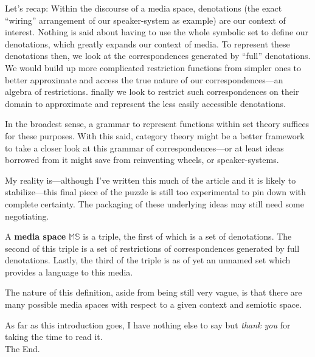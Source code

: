 \documentclass[twoside]{article}
\newenvironment{definition}[1][Definition]{\begin{trivlist}
\item[\hskip \labelsep {\bfseries #1:}]}{\end{trivlist}}
\begin{document}
Let's recap: Within the discourse of a media space, denotations (the exact ``wiring'' arrangement of our speaker-system
as example) are our context of interest. Nothing is said about having to use the whole symbolic set to define our denotations,
which greatly expands our context of media. To represent these denotations then, we look at the correspondences generated
by ``full'' denotations. We would build up more complicated restriction functions from simpler ones to better approximate
and access the true nature of our correspondences---an algebra of restrictions. finally we look to restrict such
correspondences on their domain to approximate and represent the less easily accessible denotations.

In the broadest sense, a grammar to represent functions within set theory suffices for these purposes.  With this said,
category theory might be a better framework to take a closer look at this grammar of correspondences---or at least ideas
borrowed from it might save from reinventing wheels, or speaker-systems.

My reality is---although I've written this much of the article and it is likely to stabilize---this final piece of the puzzle
is still too experimental to pin down with complete certainty. The packaging of these underlying ideas may still need some
negotiating.

\begin{definition}[Media Space]

A {\bfseries media space} $ \mathbb{MS} $ is a triple, the first of which is a set of denotations. The second of this triple
is a set of restrictions of correspondences generated by full denotations. Lastly, the third of the triple is as of yet an
unnamed set which provides a language to this media.

\end{definition}

The nature of this definition, aside from being still very vague, is that there are many possible media spaces with respect
to a given context and semiotic space.

As far as this introduction goes, I have nothing else to say but \emph{thank you} for taking the time to read it.\\[0.15cm]

The End.
\end{document}
